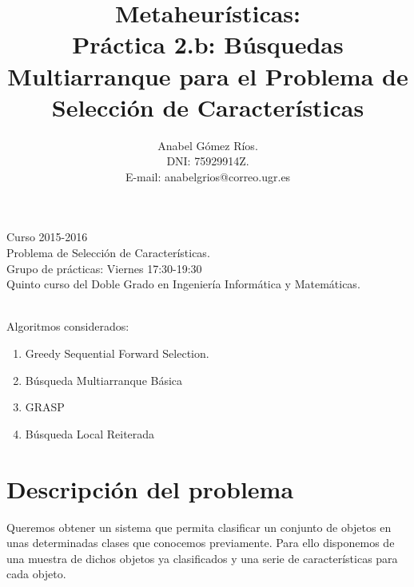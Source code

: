 \documentclass[12pt]{article}
\title{Metaheur\'isticas:\\
 Pr\'actica 2.b: B\'usquedas Multiarranque para el Problema de Selección de Características}
\author{Anabel G\'omez R\'ios.\\
 DNI: 75929914Z.\\
 E-mail: anabelgrios@correo.ugr.es}
\begin{document}
\maketitle

\begin{center}
Curso 2015-2016\\

Problema de Selección de Características.\\ 

Grupo de prácticas: Viernes 17:30-19:30\\

Quinto curso del Doble Grado en Ingeniería Informática y Matemáticas.\\
\textit{ }\\
\end{center}

Algoritmos considerados:
\begin{enumerate}
\item Greedy Sequential Forward Selection.
\item Búsqueda Multiarranque Básica
\item GRASP
\item Búsqueda Local Reiterada
\end{enumerate}

\newpage

\tableofcontents

\newpage

\section{Descripción del problema}
Queremos obtener un sistema que permita clasificar un conjunto de objetos en unas determinadas clases que conocemos previamente. Para ello disponemos de una muestra de dichos objetos ya clasificados y una serie de características para cada objeto.\\
\end{document}
